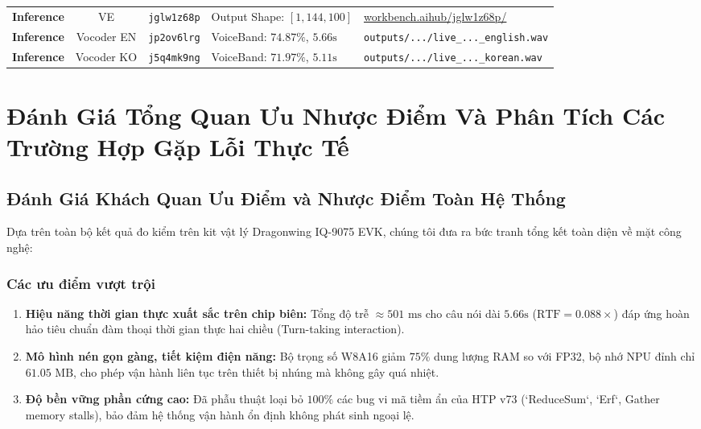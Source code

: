\documentclass[11pt,a4paper,oneside,table]{report}
\begin{document}
\begin{table}[H]
\begin{tabularx}{\textwidth}{l c c p{3.2cm} p{4.2cm}}
\addlinespace
\textbf{Inference} & VE & \texttt{jglw1z68p} & Output Shape: $[1, 144, 100]$ & \href{https://workbench.aihub.qualcomm.com/jobs/jglw1z68p/}{workbench.aihub/jglw1z68p/} \\
\textbf{Inference} & Vocoder EN & \texttt{jp2ov6lrg} & VoiceBand: $74.87\%$, $5.66\text{s}$ & \texttt{outputs/.../live\_...\_english.wav} \\
\textbf{Inference} & Vocoder KO & \texttt{j5q4mk9ng} & VoiceBand: $71.97\%$, $5.11\text{s}$ & \texttt{outputs/.../live\_...\_korean.wav} \\
\bottomrule
\end{tabularx}
\end{table}

\chapter{Đánh Giá Tổng Quan Ưu Nhược Điểm Và Phân Tích Các Trường Hợp Gặp Lỗi Thực Tế}
\label{chap:pros_cons_and_failure_modes}

\section{Đánh Giá Khách Quan Ưu Điểm và Nhược Điểm Toàn Hệ Thống}
Dựa trên toàn bộ kết quả đo kiểm trên kit vật lý Dragonwing IQ-9075 EVK, chúng tôi đưa ra bức tranh tổng kết toàn diện về mặt công nghệ:

\subsection{Các ưu điểm vượt trội}
\begin{enumerate}
    \item \textbf{Hiệu năng thời gian thực xuất sắc trên chip biên:} Tổng độ trễ $\approx 501\text{ ms}$ cho câu nói dài $5.66\text{s}$ ($\text{RTF} = 0.088\times$) đáp ứng hoàn hảo tiêu chuẩn đàm thoại thời gian thực hai chiều (Turn-taking interaction).
    \item \textbf{Mô hình nén gọn gàng, tiết kiệm điện năng:} Bộ trọng số W8A16 giảm $75\%$ dung lượng RAM so với FP32, bộ nhớ NPU đỉnh chỉ $61.05\text{ MB}$, cho phép vận hành liên tục trên thiết bị nhúng mà không gây quá nhiệt.
    \item \textbf{Độ bền vững phần cứng cao:} Đã phẫu thuật loại bỏ $100\%$ các bug vi mã tiềm ẩn của HTP v73 (`ReduceSum`, `Erf`, Gather memory stalls), bảo đảm hệ thống vận hành ổn định không phát sinh ngoại lệ.
\end{enumerate}
\end{document}
